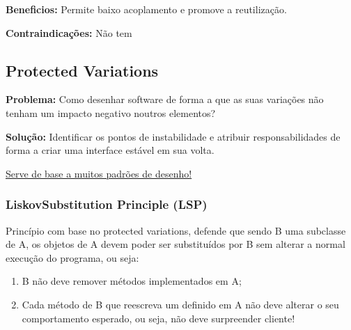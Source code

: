 \documentclass{article}
\begin{document}
\begin{flushleft}
    \textbf{Beneficios:} 
    Permite baixo acoplamento e promove a reutilização.
\end{flushleft}

\begin{flushleft}
    \textbf{Contraindicações:} Não tem
\end{flushleft}

\subsection{Protected Variations}

\begin{flushleft}
    \textbf{Problema:} Como desenhar software de forma a que as suas variações não tenham um
    impacto negativo noutros elementos?


    \vspace{3mm}
    \textbf{Solução:} Identificar os pontos de instabilidade e atribuir responsabilidades de forma a
    criar uma interface estável em sua volta.

    \vspace{3mm}
    \uline{Serve de base a muitos padrões de desenho!}
\end{flushleft}

\subsubsection{LiskovSubstitution Principle (LSP)}

Princípio com base no protected variations, defende que sendo B uma subclasse de
A, os objetos de A devem poder ser substituídos por B sem alterar a normal execução
do programa, ou seja:

\begin{enumerate}
    \item B não deve remover métodos implementados em A;
    \item Cada método de B que reescreva um definido em A não deve alterar o seu
    comportamento esperado, ou seja, não deve surpreender cliente!
\end{enumerate}
\end{document}
